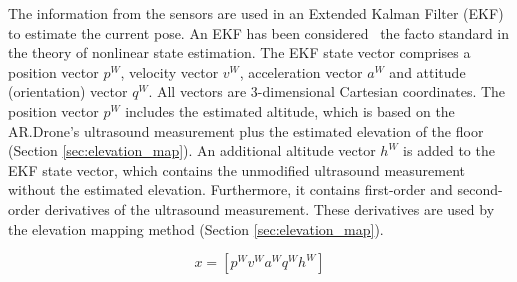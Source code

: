 The information from the sensors are used in an Extended Kalman Filter (EKF) to estimate the current pose.
An EKF has been considered~\cite{julier2004unscented} the facto standard in the theory of nonlinear state estimation.
The EKF state vector comprises a position vector $p^{W}$, velocity vector $v^{W}$, acceleration vector $a^{W}$ and attitude (orientation) vector $q^{W}$.
All vectors are 3-dimensional Cartesian coordinates.
The position vector $p^{W}$ includes the estimated altitude, which is based on the AR.Drone's ultrasound measurement plus the estimated elevation of the floor (Section \ref{sec:elevation_map}).
An additional altitude vector $h^W$ is added to the EKF state vector, which contains the unmodified ultrasound measurement without the estimated elevation.
Furthermore, it contains first-order and second-order derivatives of the ultrasound measurement.
These derivatives are used by the elevation mapping method (Section \ref{sec:elevation_map}).

\begin{equation}
x = [ p^{W}  v^{W}  a^{W}  q^{W} h^{W} ]
\label{eq:EKF_state_vecor}
\end{equation}

